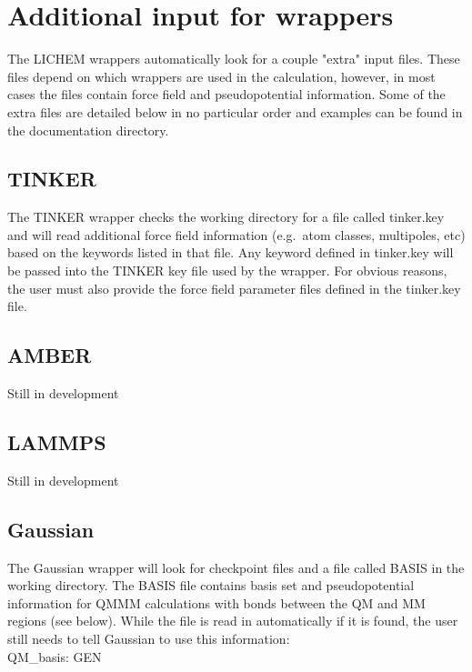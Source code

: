 \documentclass[12pt]{report}
\begin{document}
\section{Additional input for wrappers}

The LICHEM wrappers automatically look for a couple "extra" input files.
These files depend on which wrappers are used in the calculation, however, in
most cases the files contain force field and pseudopotential information.
Some of the extra files are detailed below in no particular order and examples
can be found in the documentation directory.

\subsection{TINKER}

The TINKER wrapper checks the working directory for a file called tinker.key
and will read additional force field information (e.g.\ atom classes,
multipoles, etc) based on the keywords listed in that file.
Any keyword defined in tinker.key will be passed into the TINKER key file used
by the wrapper.
For obvious reasons, the user must also provide the force field parameter
files defined in the tinker.key file.

\subsection{AMBER}

{\color{red}Still in development}

\subsection{LAMMPS}

{\color{red}Still in development}

\subsection{Gaussian}

The Gaussian wrapper will look for checkpoint files and a file called BASIS in
the working directory.
The BASIS file contains basis set and pseudopotential information for QMMM
calculations with bonds between the QM and MM regions (see below).
While the file is read in automatically if it is found, the user still needs
to tell Gaussian to use this information: \\

QM\_basis: GEN \\
\end{document}
